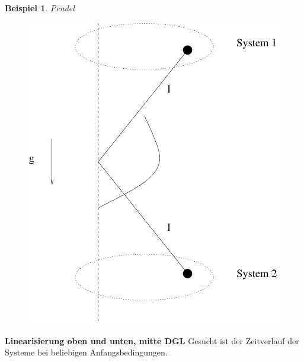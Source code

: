\documentclass[12pt,a4paper,ngerman]{scrartcl}
\newtheorem{bsp}{Beispiel}[section] %
\begin{document}
\begin{bsp}
Pendel
\end{bsp}
\begin{figure}[H]
  \centering
  \includegraphics[width=0.4\linewidth]{sysregel_bsp_4_1}
\end{figure}
\textbf{Linearisierung oben und unten, mitte DGL}
Gesucht ist der Zeitverlauf der Systeme bei beliebigen Anfangsbedingungen.
\end{document}
